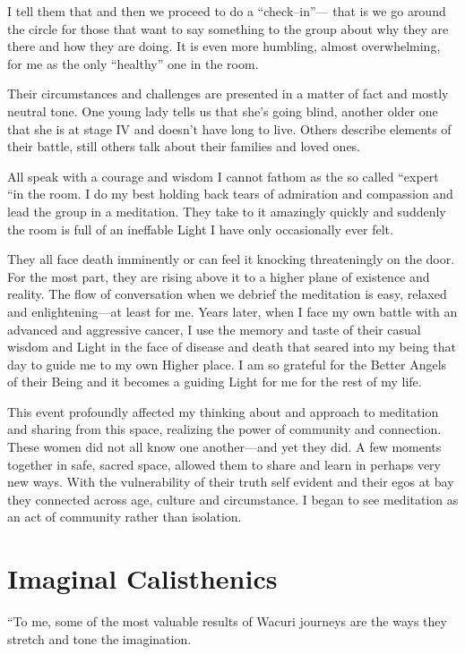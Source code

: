 \documentclass[12pt]{book}
\begin{document}
I tell them that and then we proceed to do a ``check--in''--- that is we
go around the circle for those that want to say something to the
group about why they are there and how they are doing. It is even
more humbling, almost overwhelming, for me as the only ``healthy'' one
in the room.

Their circumstances and challenges are presented in a matter of fact
and mostly neutral tone. One young lady tells us that she's going
blind, another older one that she is at stage IV and doesn't have
long to live. Others describe elements of their battle, still others
talk about their families and loved ones.

All speak with a courage and wisdom I cannot fathom as the so called
“expert “in the room.  I do my best holding back tears of admiration
and compassion and lead the group in a meditation. They take to it
amazingly quickly and suddenly the room is full of an ineffable Light
I have only occasionally ever felt.

They all face death imminently or can feel it knocking threateningly on
the door.
For the most part, they are rising above it to a higher
plane of existence and reality. The flow of conversation when we
debrief the meditation is easy, relaxed and enlightening---at least for
me.
Years later, when I face my own battle with an advanced and
aggressive cancer, I use the memory and taste of their casual wisdom
and Light in the face of disease and death that seared into my being
that day to guide me to my own Higher place. I am so grateful for the
Better Angels of their Being and it becomes a guiding Light for me for
the rest of my life.

This event profoundly affected my thinking about and approach to
meditation and sharing from this space, realizing the power of
community and connection. These women did not all know one another---and
yet they did. A few moments together in safe, sacred space, allowed
them to share and learn in perhaps very new ways.  With the
vulnerability of their truth self evident and their egos at bay they
connected across age, culture and circumstance. I began to see
meditation as an act of community rather than isolation.

\section{Imaginal Calisthenics}

``To me, some of the most valuable results of Wacuri journeys are the
ways they stretch and tone the imagination.
\end{document}
